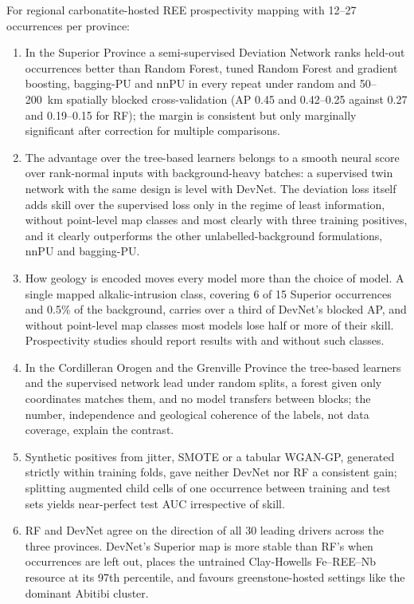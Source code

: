 \documentclass[pdflatex,sn-apa]{sn-jnl}
\begin{document}
For regional carbonatite-hosted REE prospectivity mapping with 12--27 occurrences per province:
\begin{enumerate}
\item In the Superior Province a semi-supervised Deviation Network ranks held-out occurrences better than Random Forest, tuned Random Forest and gradient boosting, bagging-PU and nnPU in every repeat under random and 50--200~km spatially blocked cross-validation (AP 0.45 and 0.42--0.25 against 0.27 and 0.19--0.15 for RF); the margin is consistent but only marginally significant after correction for multiple comparisons.
\item The advantage over the tree-based learners belongs to a smooth neural score over rank-normal inputs with background-heavy batches: a supervised twin network with the same design is level with DevNet. The deviation loss itself adds skill over the supervised loss only in the regime of least information, without point-level map classes and most clearly with three training positives, and it clearly outperforms the other unlabelled-background formulations, nnPU and bagging-PU.
\item How geology is encoded moves every model more than the choice of model. A single mapped alkalic-intrusion class, covering 6 of 15 Superior occurrences and 0.5\% of the background, carries over a third of DevNet's blocked AP, and without point-level map classes most models lose half or more of their skill. Prospectivity studies should report results with and without such classes.
\item In the Cordilleran Orogen and the Grenville Province the tree-based learners and the supervised network lead under random splits, a forest given only coordinates matches them, and no model transfers between blocks; the number, independence and geological coherence of the labels, not data coverage, explain the contrast.
\item Synthetic positives from jitter, SMOTE or a tabular WGAN-GP, generated strictly within training folds, gave neither DevNet nor RF a consistent gain; splitting augmented child cells of one occurrence between training and test sets yields near-perfect test AUC irrespective of skill.
\item RF and DevNet agree on the direction of all 30 leading drivers across the three provinces. DevNet's Superior map is more stable than RF's when occurrences are left out, places the untrained Clay-Howells Fe--REE--Nb resource at its 97th percentile, and favours greenstone-hosted settings like the dominant Abitibi cluster.
\end{enumerate}
\end{document}

